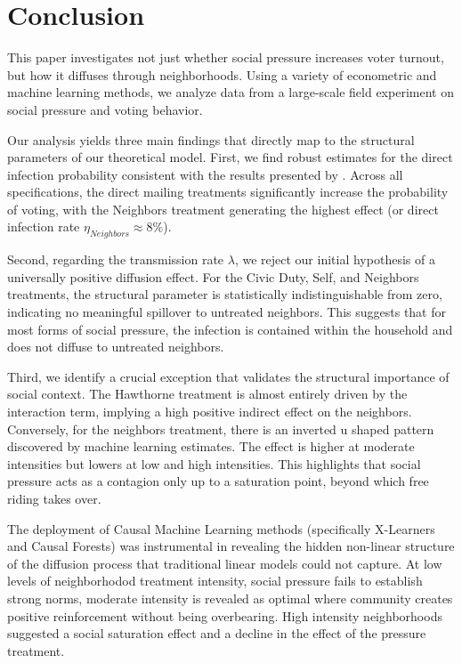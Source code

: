 \documentclass[11pt]{article}
\begin{document}
\section{Conclusion}
This paper investigates not just whether social pressure increases voter turnout, but how it diffuses through neighborhoods. Using a variety of econometric and machine learning methods, we analyze data from a large-scale field experiment on social pressure and voting behavior.

Our analysis yields three main findings that directly map to the structural parameters of our theoretical model. First, we find robust estimates for the direct infection probability consistent with the results presented by \cite{gerber_social_2008}. Across all specifications, the direct mailing treatments significantly increase the probability of voting, with the Neighbors treatment generating the highest effect (or direct infection rate $\eta_{Neighbors} \approx 8\%$).

Second, regarding the transmission rate $\lambda$, we reject our initial hypothesis of a universally positive diffusion effect. For the Civic Duty, Self, and Neighbors treatments, the structural parameter is statistically indistinguishable from zero, indicating no meaningful spillover to untreated neighbors. This suggests that for most forms of social pressure, the infection is contained within the household and does not diffuse to untreated neighbors. 

Third, we identify a crucial exception that validates the structural importance of social context. The Hawthorne treatment is almost entirely driven by the interaction term, implying a high positive indirect effect on the neighbors. Conversely, for the neighbors treatment, there is an inverted u shaped pattern discovered by machine learning estimates. The effect is higher at moderate intensities but lowers at low and high intensities. This highlights that social pressure acts as a contagion only up to a saturation point, beyond which free riding takes over.

The deployment of Causal Machine Learning methods (specifically X-Learners and Causal Forests) was instrumental in revealing the hidden non-linear structure of the diffusion process that traditional linear models could not capture. At low levels of neighborhodod treatment intensity, social pressure fails to establish strong norms, moderate intensity is revealed as optimal where community creates positive reinforcement without being overbearing. High intensity neighborhoods suggested a social saturation effect and a decline in the effect of the pressure treatment.
\end{document}
